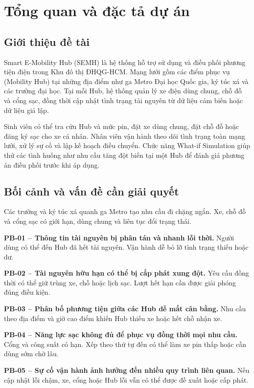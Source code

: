 \section{Tổng quan và đặc tả dự án}

\subsection{Giới thiệu đề tài}

Smart E-Mobility Hub (SEMH) là hệ thống hỗ trợ sử dụng và điều phối phương tiện điện trong Khu đô thị ĐHQG-HCM. Mạng lưới gồm các điểm phục vụ (Mobility Hub) tại những địa điểm như ga Metro Đại học Quốc gia, ký túc xá và các trường đại học. Tại mỗi Hub, hệ thống quản lý xe điện dùng chung, chỗ đỗ và cổng sạc, đồng thời cập nhật tình trạng tài nguyên từ dữ liệu cảm biến hoặc dữ liệu giả lập.

Sinh viên có thể tra cứu Hub và mức pin, đặt xe dùng chung, đặt chỗ đỗ hoặc đăng ký sạc cho xe cá nhân. Nhân viên vận hành theo dõi tình trạng toàn mạng lưới, xử lý sự cố và lập kế hoạch điều chuyển. Chức năng What-if Simulation giúp thử các tình huống như nhu cầu tăng đột biến tại một Hub để đánh giá phương án điều phối trước khi áp dụng.

\subsection{Bối cảnh và vấn đề cần giải quyết}

Các trường và ký túc xá quanh ga Metro tạo nhu cầu đi chặng ngắn. Xe, chỗ đỗ và cổng sạc có giới hạn, dùng chung và liên tục đổi trạng thái.

\noindent\textbf{PB-01 -- Thông tin tài nguyên bị phân tán và nhanh lỗi thời.} Người dùng có thể đến Hub đã hết tài nguyên. Vận hành dễ bỏ lỡ tình trạng thiếu hoặc dư.

\medskip
\noindent\textbf{PB-02 -- Tài nguyên hữu hạn có thể bị cấp phát xung đột.} Yêu cầu đồng thời có thể giữ trùng xe, chỗ hoặc lịch sạc. Lượt hết hạn cần được giải phóng đúng điều kiện.

\medskip
\noindent\textbf{PB-03 -- Phân bố phương tiện giữa các Hub dễ mất cân bằng.} Nhu cầu theo địa điểm và giờ cao điểm khiến Hub thiếu xe hoặc hết chỗ nhận xe.

\medskip
\noindent\textbf{PB-04 -- Năng lực sạc không đủ để phục vụ đồng thời mọi nhu cầu.} Cổng và công suất có hạn. Xếp theo thứ tự đến có thể làm xe pin thấp hoặc cần dùng sớm chờ lâu.

\medskip
\noindent\textbf{PB-05 -- Sự cố vận hành ảnh hưởng đến nhiều quy trình liên quan.} Nếu cập nhật lỗi chậm, xe, cổng hoặc Hub lỗi vẫn có thể được đề xuất hoặc cấp phát.

